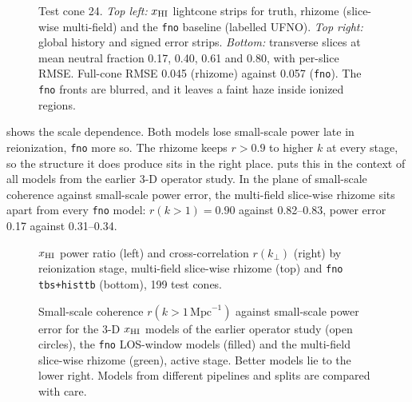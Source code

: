 \begin{figure}[!tp]
  \centering
  \caption{Test cone 24. \emph{Top left:} $x_{\mathrm{HI}}$ lightcone strips for truth, rhizome (slice-wise multi-field) and the \texttt{fno} baseline (labelled UFNO). \emph{Top right:} global history and signed error strips. \emph{Bottom:} transverse slices at mean neutral fraction 0.17, 0.40, 0.61 and 0.80, with per-slice RMSE. Full-cone RMSE 0.045 (rhizome) against 0.057 (\texttt{fno}). The \texttt{fno} fronts are blurred, and it leaves a faint haze inside ionized regions.}
  \label{fig:cone24}
\end{figure}

 shows the scale dependence. Both models lose small-scale power late in reionization, \texttt{fno} more so. The rhizome keeps $r>0.9$ to higher $k$ at every stage, so the structure it does produce sits in the right place.  puts this in the context of all models from the earlier 3-D operator study. In the plane of small-scale coherence against small-scale power error, the multi-field slice-wise rhizome sits apart from every \texttt{fno} model: $r(k>1)=0.90$ against 0.82--0.83, power error 0.17 against 0.31--0.34.

\begin{figure}[!tp]
  \centering
  \caption{$x_{\mathrm{HI}}$ power ratio (left) and cross-correlation $r(k_\perp)$ (right) by reionization stage, multi-field slice-wise rhizome (top) and \texttt{fno} \texttt{tbs+histtb} (bottom), 199 test cones.}
  \label{fig:h2h-ps}
\end{figure}

\begin{figure}[!tp]
  \centering
  \caption{Small-scale coherence $r(k>1\,\mathrm{Mpc}^{-1})$ against small-scale power error for the 3-D $x_{\mathrm{HI}}$ models of the earlier operator study (open circles), the \texttt{fno} LOS-window models (filled) and the multi-field slice-wise rhizome (green), active stage. Better models lie to the lower right. Models from different pipelines and splits are compared with care.}
  \label{fig:ps-plane}
\end{figure}

